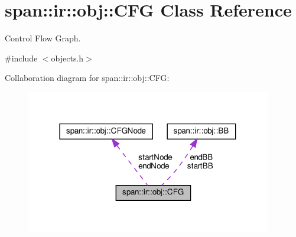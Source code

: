 \hypertarget{classspan_1_1ir_1_1obj_1_1CFG}{}\section{span\+:\+:ir\+:\+:obj\+:\+:C\+FG Class Reference}
\label{classspan_1_1ir_1_1obj_1_1CFG}


Control Flow Graph.  




{\ttfamily \#include $<$objects.\+h$>$}



Collaboration diagram for span\+:\+:ir\+:\+:obj\+:\+:C\+FG\+:\nopagebreak
\begin{figure}[H]
\begin{center}
\leavevmode
\includegraphics[width=304pt]{classspan_1_1ir_1_1obj_1_1CFG__coll__graph}
\end{center}
\end{figure}
